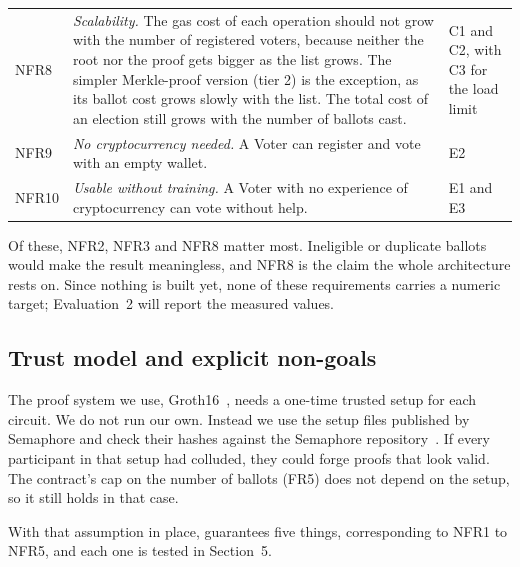 \begin{longtable}{@{}>{\RaggedRight\arraybackslash\small}p{1.5cm}>{\RaggedRight\arraybackslash\small}p{10.4cm}>{\RaggedRight\arraybackslash\small}p{5.4cm}@{}}
  \addlinespace[2pt]
  NFR8 & \emph{Scalability.} The gas cost of each operation should not grow with the number of registered voters, because neither the root nor the proof gets bigger as the list grows. The simpler Merkle-proof version (tier 2) is the exception, as its ballot cost grows slowly with the list. The total cost of an election still grows with the number of ballots cast. & C1 and C2, with C3 for the load limit \\
  \addlinespace[2pt]
  NFR9 & \emph{No cryptocurrency needed.} A Voter can register and vote with an empty wallet. & E2 \\
  \addlinespace[2pt]
  NFR10 & \emph{Usable without training.} A Voter with no experience of cryptocurrency can vote without help. & E1 and E3 \\
\end{longtable}

Of these, NFR2, NFR3 and NFR8 matter most. Ineligible or duplicate ballots would
make the result meaningless, and NFR8 is the claim the whole architecture rests
on. Since nothing is built yet, none of these requirements carries a numeric
target; Evaluation~2 will report the measured values.

\subsection{Trust model and explicit non-goals}\label{sec:trust}

The proof system we use, Groth16~\cite{groth16}, needs a one-time trusted setup
for each circuit. We do not run our own. Instead we use the setup files
published by Semaphore and check their hashes against the Semaphore
repository~\cite{semaphore}. If every participant in that setup had colluded,
they could forge proofs that look valid. The contract's cap on the number of
ballots (FR5) does not depend on the setup, so it still holds in that case.

With that assumption in place, \projectname{} guarantees five things,
corresponding to NFR1 to NFR5, and each one is tested in Section~5.

